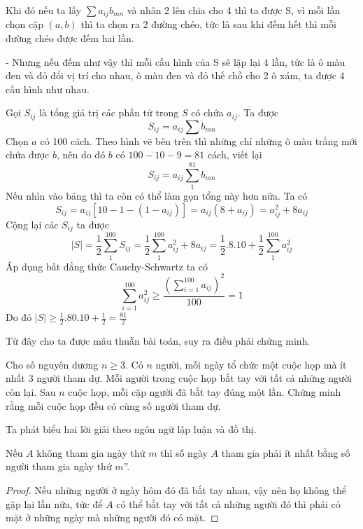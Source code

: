 \documentclass[11pt]{scrartcl}
\begin{document}
\begin{itemize}[label=, leftmargin=0em, itemsep=0.5em]
\begin{sol}
\begin{itemize}[label=,leftmargin=0em]
        Khi đó nếu ta lấy $\sum a_{ij}b_{mn}$ và nhân 2 lên chia cho 4 thì ta được S, vì mỗi lần chọn cặp $(a,b)$ thì ta chọn ra 2 đường chéo, tức là sau khi đếm hết thì mỗi đường chéo được đếm hai lần. 
    
        - Nhưng nếu đếm như vậy thì mỗi cấu hình của S sẽ lặp lại 4 lần, tức là ô màu đen và đỏ đổi vị trí cho nhau, ô màu đen và đỏ thế chỗ cho 2 ô xám, ta được 4 cấu hình như nhau.
    
        Gọi $S_{ij}$ là tổng giá trị các phần tử trong $S$ có chứa $a_{ij}$. Ta được $$S_{ij} = a_{ij} \sum b_{mn}$$
        Chọn $a$ có 100 cách. Theo hình vẽ bên trên thì những chỉ những ô màu trắng mới chứa được $b$, nên do đó $b$ có $100 - 10 - 9 = 81$ cách, viết lại 
        $$ S_{ij} = a_{ij}\sum_{1}^{81} b_{mn}
        $$
        Nếu nhìn vào bảng thì ta còn có thể làm gọn tổng này hơn nữa. Ta có
        $$ S_{ij} = a_{ij}[10 - 1 - (1 - a_{ij}) ]
        = a_{ij}(8 + a_{ij})
        = a_{ij}^2 + 8a_{ij}
        $$
        Cộng lại các $S_{ij}$ ta được
        $$ |S| = \frac{1}{2}\sum_{1}^{100} S_{ij} =\frac{1}{2} \sum_{1}^{100} a_{ij}^2 + 8a_{ij} =  \frac{1}{2}.8.10 + \frac{1}{2}\sum_{1}^{100} a_{ij}^2  
        $$
        Áp dụng bất đẳng thức Cauchy-Schwartz ta có 
        $$ \sum_{i=1}^{100} a_{ij}^2 \geq \frac{ \left(\displaystyle \sum_{i=1}^{100}a_{ij}\right)^2}{100} = 1
        $$
        Do đó $|S| \geq \frac{1}{2}.80.10 + \frac{1}{2} = \frac{81}{2}$
    \end{itemize}
    Từ đây cho ta được mâu thuẫn bài toán, suy ra điều phải chứng minh.
    \end{sol}
    \begin{bt}
        Cho số nguyên dương $n \geq 3$. Có $n$ người, mỗi ngày tổ chức một cuộc họp mà ít nhất 3 người tham dự. Mỗi người trong cuộc họp bắt tay với tất cả những người còn lại. Sau $n$ cuộc họp, mỗi cặp người đã bắt tay đúng một lần. Chứng minh rằng mỗi cuộc họp đều có cùng số người tham dự.
    \end{bt}
    Ta phát biểu hai lời giải theo ngôn ngữ lập luận và đồ thị. 
    \begin{sol}

         Nếu $A$ không tham gia ngày thứ $m$ thì số ngày $A$ tham gia phải ít nhất bằng số người tham gia ngày thứ $m$''. 
        \begin{proof}
            Nếu những người ở ngày hôm đó đã bắt tay nhau, vậy nên họ không thể gặp lại lần nữa, tức để $A$ có thể bắt tay với tất cả những người đó thì phải có mặt ở những ngày mà những người đó có mặt.
        \end{proof}
        

\end{sol}
\end{itemize}
\end{document}
